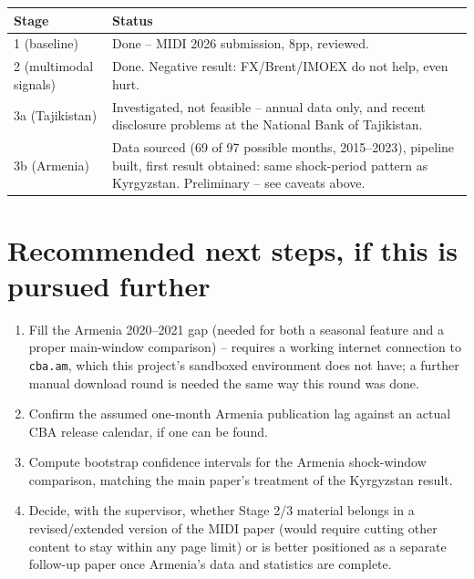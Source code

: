 \documentclass[11pt]{article}
\begin{document}
\begin{table}[h]
\centering
\begin{tabular}{p{3.2cm}p{9.3cm}}
\toprule
Stage & Status \\
\midrule
1 (baseline) & Done -- MIDI 2026 submission, 8pp, reviewed. \\
2 (multimodal signals) & Done. Negative result: FX/Brent/IMOEX do not help, even hurt. \\
3a (Tajikistan) & Investigated, not feasible -- annual data only, and recent disclosure
  problems at the National Bank of Tajikistan. \\
3b (Armenia) & Data sourced (69 of 97 possible months, 2015--2023), pipeline built, first
  result obtained: same shock-period pattern as Kyrgyzstan. Preliminary -- see caveats above. \\
\bottomrule
\end{tabular}
\end{table}

\section{Recommended next steps, if this is pursued further}
\begin{enumerate}
\item Fill the Armenia 2020--2021 gap (needed for both a seasonal feature and a proper
  main-window comparison) -- requires a working internet connection to \texttt{cba.am}, which
  this project's sandboxed environment does not have; a further manual download round is needed
  the same way this round was done.
\item Confirm the assumed one-month Armenia publication lag against an actual CBA release
  calendar, if one can be found.
\item Compute bootstrap confidence intervals for the Armenia shock-window comparison, matching
  the main paper's treatment of the Kyrgyzstan result.
\item Decide, with the supervisor, whether Stage 2/3 material belongs in a revised/extended
  version of the MIDI paper (would require cutting other content to stay within any page limit)
  or is better positioned as a separate follow-up paper once Armenia's data and statistics are
  complete.
\end{enumerate}
\end{document}
